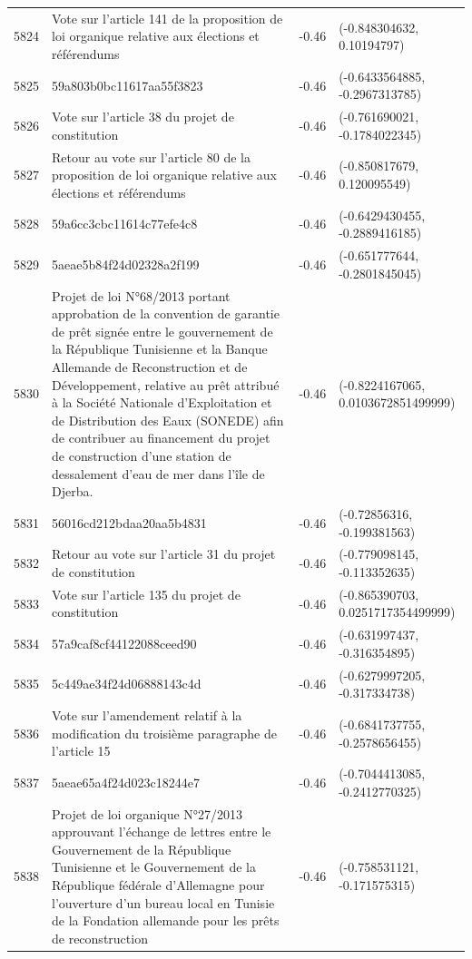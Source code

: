 \begin{table}[ht]
\begin{tabular}{rlrl}
  5824 & Vote sur l'article 141 de la proposition de loi organique relative aux élections et référendums & -0.46 & (-0.848304632, 0.10194797) \\ 
  5825 & 59a803b0bc11617aa55f3823 & -0.46 & (-0.6433564885, -0.2967313785) \\ 
  5826 & Vote sur l'article 38 du projet de constitution & -0.46 & (-0.761690021, -0.1784022345) \\ 
  5827 & Retour au vote sur l'article 80 de la proposition de loi organique relative aux élections et référendums & -0.46 & (-0.850817679, 0.120095549) \\ 
  5828 & 59a6cc3cbc11614c77efe4c8 & -0.46 & (-0.6429430455, -0.2889416185) \\ 
  5829 & 5aeae5b84f24d02328a2f199 & -0.46 & (-0.651777644, -0.2801845045) \\ 
  5830 & Projet de loi N°68/2013 portant approbation de la convention de garantie de prêt signée entre le gouvernement de la République Tunisienne et la Banque Allemande de Reconstruction et de Développement, relative au prêt attribué à la Société Nationale d'Exploitation et de Distribution des Eaux (SONEDE) afin de contribuer au financement du projet de construction d'une station de dessalement d'eau de mer dans l'île de Djerba. & -0.46 & (-0.8224167065, 0.0103672851499999) \\ 
  5831 & 56016cd212bdaa20aa5b4831 & -0.46 & (-0.72856316, -0.199381563) \\ 
  5832 & Retour au vote sur l'article 31 du projet de constitution & -0.46 & (-0.779098145, -0.113352635) \\ 
  5833 & Vote sur l'article 135 du projet de constitution & -0.46 & (-0.865390703, 0.0251717354499999) \\ 
  5834 & 57a9caf8cf44122088ceed90 & -0.46 & (-0.631997437, -0.316354895) \\ 
  5835 & 5c449ae34f24d06888143c4d & -0.46 & (-0.6279997205, -0.317334738) \\ 
  5836 & Vote sur l'amendement relatif à la modification du troisième paragraphe de l'article 15 & -0.46 & (-0.6841737755, -0.2578656455) \\ 
  5837 & 5aeae65a4f24d023c18244e7 & -0.46 & (-0.7044413085, -0.2412770325) \\ 
  5838 & Projet de loi organique N°27/2013 approuvant l'échange de lettres entre le Gouvernement de la République Tunisienne et le Gouvernement de la République fédérale d'Allemagne pour l'ouverture d'un bureau local en Tunisie de la Fondation allemande pour les prêts de reconstruction & -0.46 & (-0.758531121, -0.171575315) \\ 

\end{tabular}
\end{table}
